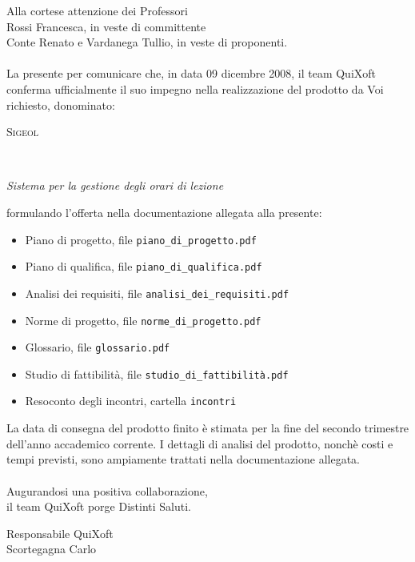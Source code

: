 \documentclass[11pt,a4paper]{article}
\begin{document}
Alla cortese attenzione dei Professori \\
Rossi Francesca, in veste di committente \\
Conte Renato e Vardanega Tullio, in veste di proponenti. \\\\
\bigskip
\bigskip
\bigskip
La presente per comunicare che, in data 09 dicembre 2008, il team QuiXoft conferma ufficialmente il suo impegno nella realizzazione del prodotto da Voi richiesto, donominato: \\
\bigskip
\bigskip
\begin{center}
\begin{Huge} \textsc{Sigeol} \end{Huge} \\
\begin{Large} \textit{Sistema per la gestione degli orari di lezione} \end{Large}
\end{center}
\bigskip
\bigskip
formulando l'offerta nella documentazione allegata alla presente:
\begin{itemize}
 \item Piano di progetto, file \verb|piano_di_progetto.pdf|
 \item Piano di qualifica, file \verb|piano_di_qualifica.pdf|
 \item Analisi dei requisiti, file \verb|analisi_dei_requisiti.pdf|
 \item Norme di progetto, file \verb|norme_di_progetto.pdf|
 \item Glossario, file \verb|glossario.pdf|
 \item Studio di fattibilità, file \verb|studio_di_fattibilità.pdf|
 \item Resoconto degli incontri, cartella \verb|incontri|
\end{itemize}
\bigskip
La data di consegna del prodotto finito è stimata per la fine del secondo trimestre dell'anno accademico corrente. I dettagli di analisi del prodotto, nonchè costi e tempi previsti, sono ampiamente trattati nella documentazione allegata. \\\\
\bigskip
Augurandosi una positiva collaborazione, \\
il team QuiXoft porge Distinti Saluti. \\
\begin{flushright}
Responsabile QuiXoft \\
Scortegagna Carlo
\end{flushright}
\end{document}
